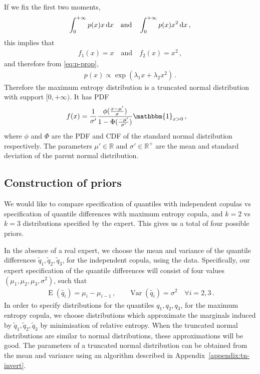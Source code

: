 \documentclass{article}
\DeclareMathOperator{\E}{E}
\DeclareMathOperator{\Var}{Var}
\newcommand{\R}{\mathbb{R}}
\newcommand{\dd}{{\rm d}}
\begin{document}
If we fix the first two moments,
%
\begin{align*}
	\int_{0}^{+\infty} p(x) x \, \dd x \quad \text{and} \quad
		\int_{0}^{+\infty} p(x) x ^ 2 \, \dd x \,,
\end{align*}
%
this implies that
%
\begin{align*}
	f_1(x) = x \quad \text{and} \quad
		f_2(x) = x ^ 2 \,,
\end{align*}
%
and therefore from \eqref{eq:p-prop},
%
\begin{align*}
	p(x) \propto \exp\left(\lambda_1 x + \lambda_2 x ^ 2\right) \,.
\end{align*}
%
Therefore the maximum entropy distribution is a truncated normal distribution
with support $[0, +\infty)$. It has PDF
%
\begin{align*}
	f(x) &= \frac{1}{\sigma'} \frac{\phi(\frac{x - \mu'}{\sigma})}
		{1 - \Phi(\frac{-\mu'}{\sigma'})}
		\mathbbm{1}_{x > 0} \,,
\end{align*}
%
where $\phi$ and $\Phi$ are the PDF and CDF of the
standard normal distribution respectively.
The parameters $\mu' \in \R$ and $\sigma' \in \R^+$
are the mean and standard deviation of the
parent normal distribution.
%
\subsection{Construction of priors}
%
We would like to compare 
specification of quantiles with independent copulas vs
specification of quantile differences with maximum entropy copula,
and $k = 2$ vs $k = 3$ distributions specified by the expert.
This gives us a total of four possible priors.
%

%
In the absence of a real expert, we choose the mean and variance
of the quantile differences $\tilde{q}_1, \tilde{q}_2, \tilde{q}_3$,
for the independent copula, using the data.
Specifically, our expert specification
of the quantile differences will consist of
four values $(\mu_1, \mu_2, \mu_3, \sigma ^ 2)$, such that
%
\begin{align*}
	\E(\tilde{q_i}) = \mu_i - \mu_{i - 1} \,,
		&\quad \Var(\tilde{q_i}) = \sigma ^ 2 \quad \forall i = 2, 3 \,.
\end{align*}
%
In order to specify distributions for the quantiles $q_1, q_2, q_3$,
for the maximum entropy copula,
we choose distributions which approximate the marginals induced
by $\tilde{q}_1, \tilde{q}_2, \tilde{q}_3$
by minimisation of relative entropy.
When the truncated normal distributions are similar to normal distributions,
these approximations will be good.
The parameters of a truncated normal distribution can be obtained
from the mean and variance using an algorithm described in Appendix~\ref{appendix:tn-invert}.
%
\end{document}
